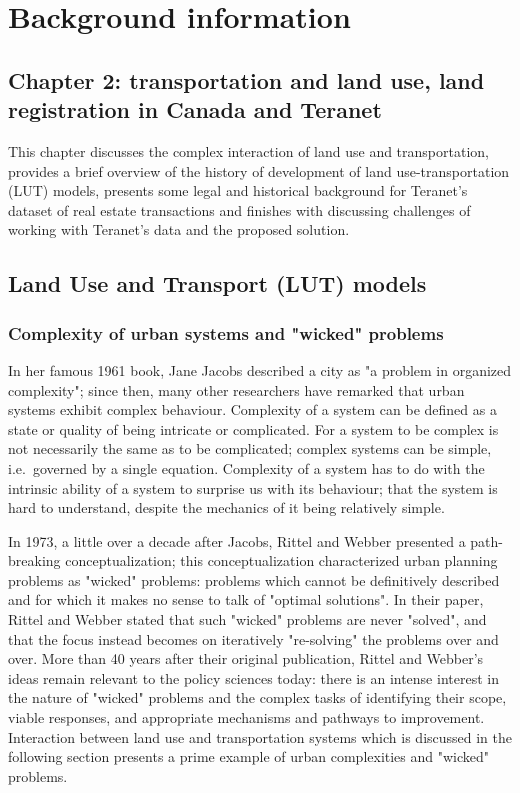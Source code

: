 \chapter[Background information]{Background information} \label{ch:background}

\section{Chapter 2: transportation and land use, land registration in Canada and Teranet} \label{sec:chapter_2_intro}

This chapter discusses the complex interaction of land use and transportation, provides a brief overview of the history of development of land use-transportation (LUT) models, presents some legal and historical background for Teranet's dataset of real estate transactions and finishes with discussing challenges of working with Teranet's data and the proposed solution.

\section{Land Use and Transport (LUT) models} \label{sec:evolution_of_models_of_urban_systems}

\subsection{Complexity of urban systems and "wicked" problems} \label{subsec:complexity_and_wicked_problems}

In her famous 1961 book, Jane Jacobs\cite{Jacobs1961} described a city as "a problem in organized complexity";
since then, many other researchers have remarked that urban systems exhibit complex behaviour\cite{Batty2008, Bettencourt2013}.
Complexity of a system can be defined as a state or quality of being intricate or complicated.
For a system to be complex is not necessarily the same as to be complicated;
complex systems can be simple, i.e.\ governed by a single equation.
Complexity of a system has to do with the intrinsic ability of a system to surprise us with its behaviour;
that the system is hard to understand, despite the mechanics of it being relatively simple.

In 1973, a little over a decade after Jacobs, Rittel and Webber\cite{Rittel1973} presented a path-breaking conceptualization;
this conceptualization characterized urban planning problems as "wicked" problems: problems which cannot be definitively described and for which it makes no sense to talk of "optimal solutions".
In their paper, Rittel and Webber stated that such "wicked" problems are never "solved", and that the focus instead becomes on iteratively "re-solving" the problems over and over.
More than 40 years after their original publication, Rittel and Webber's ideas remain relevant to the policy sciences today: there is an intense interest in the nature of "wicked" problems and the complex tasks of identifying their scope, viable responses, and appropriate mechanisms and pathways to improvement\cite{Crowley2017}.
Interaction between land use and transportation systems which is discussed in the following section presents a prime example of urban complexities and "wicked" problems.

